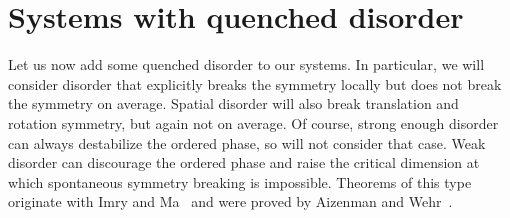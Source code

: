 \documentclass[pra,aps,twocolumn, amsfonts,amsmath,amssymb,nofootinbib,superscriptaddress]{revtex4}
\renewcommand{\max}{\text{max}}
\begin{document}



\section{Systems with quenched disorder} \label{sec:disord}

Let us now add some quenched disorder to our systems. In particular, we will consider disorder that explicitly breaks the symmetry locally but does not break the symmetry on average. Spatial disorder will also break translation and rotation symmetry, but again not on average. Of course, strong enough disorder can always destabilize the ordered phase, so will not consider that case. Weak disorder can discourage the ordered phase and raise the critical dimension at which spontaneous symmetry breaking is impossible. Theorems of this type originate with Imry and Ma~\cite{ImryMa} and were proved by Aizenman and Wehr~\cite{Aizenman}.
\end{document}
